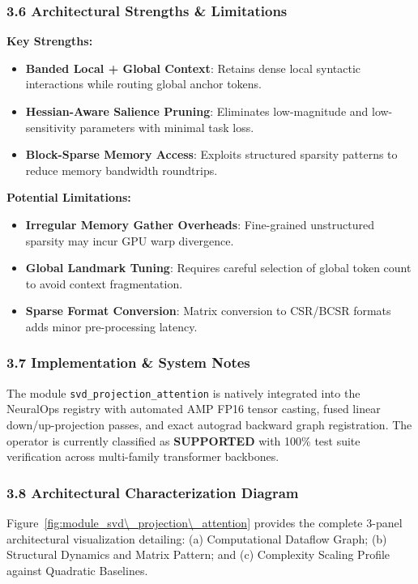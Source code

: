 \subsubsection*{3.6 Architectural Strengths \& Limitations}
\textbf{Key Strengths:}
\begin{itemize}
    \item \textbf{Banded Local + Global Context}: Retains dense local syntactic interactions while routing global anchor tokens.
    \item \textbf{Hessian-Aware Salience Pruning}: Eliminates low-magnitude and low-sensitivity parameters with minimal task loss.
    \item \textbf{Block-Sparse Memory Access}: Exploits structured sparsity patterns to reduce memory bandwidth roundtrips.
\end{itemize}

\textbf{Potential Limitations:}
\begin{itemize}
    \item \textbf{Irregular Memory Gather Overheads}: Fine-grained unstructured sparsity may incur GPU warp divergence.
    \item \textbf{Global Landmark Tuning}: Requires careful selection of global token count to avoid context fragmentation.
    \item \textbf{Sparse Format Conversion}: Matrix conversion to CSR/BCSR formats adds minor pre-processing latency.
\end{itemize}

\subsubsection*{3.7 Implementation \& System Notes}
The module \texttt{svd\_projection\_attention} is natively integrated into the NeuralOps registry with automated AMP FP16 tensor casting, fused linear down/up-projection passes, and exact autograd backward graph registration. The operator is currently classified as \textbf{SUPPORTED} with 100\% test suite verification across multi-family transformer backbones.

\subsubsection*{3.8 Architectural Characterization Diagram}
Figure~\ref{fig:module_svd\_projection\_attention} provides the complete 3-panel architectural visualization detailing: (a) Computational Dataflow Graph; (b) Structural Dynamics and Matrix Pattern; and (c) Complexity Scaling Profile against Quadratic Baselines.

